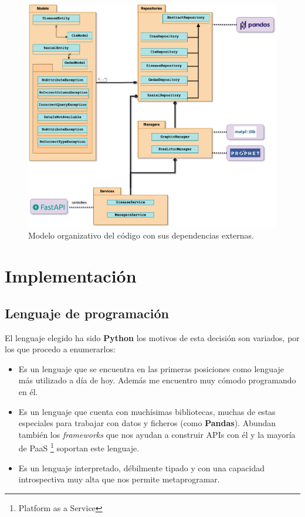 \begin{figure}[]
	\centering	
	\includegraphics[scale=0.5]{doc/logos/imgs/arquitectonico.png}
	\caption{ \cite{rtve-cis} Modelo organizativo del código con sus dependencias externas. }
    \label{fig:worst_f_value}
\end{figure}



\section{Implementación}
\subsection{Lenguaje de programación}
El lenguaje elegido ha sido \textbf{Python} los motivos de esta decisión son variados, por los que procedo a enumerarlos:
\begin{itemize}
    \item Es un lenguaje que se encuentra en las \cite{tiobe} primeras posiciones como lenguaje más utilizado a día de hoy. Además me encuentro muy cómodo programando en él.
    \item Es un lenguaje que cuenta con muchísimas bibliotecas, muchas de estas especiales para trabajar con datos y ficheros (como \textbf{Pandas}). Abundan también los \textit{frameworks} que nos ayudan a construir APIs con él y la mayoría de PaaS \footnote{Platform as a Service} soportan este lenguaje.
    \item Es un lenguaje interpretado, débilmente tipado y con una capacidad introspectiva muy alta que nos permite metaprogramar.
\end{itemize}

